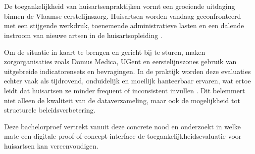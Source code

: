 
\chapter{}%
\label{ch:inleiding}



De toegankelijkheid van huisartsenpraktijken vormt een groeiende uitdaging binnen de Vlaamse
eerstelijnszorg. Huisartsen worden vandaag geconfronteerd met een stijgende werkdruk,
toenemende administratieve lasten en een dalende instroom van nieuwe artsen in de huisartsopleiding \autocite{Rampelberg2025a}.
\medskip

Om de situatie in kaart te brengen en gericht bij te sturen, maken zorgorganisaties zoals Domus Medica,
UGent en eerstelijnszones gebruik van uitgebreide indicatorensets en bevragingen. In de praktijk
worden deze evaluaties echter vaak als tijdrovend, onduidelijk en moeilijk hanteerbaar ervaren,
wat ertoe leidt dat huisartsen ze minder frequent of inconsistent invullen \autocite{Merckx2023}. Dit belemmert niet alleen
de kwaliteit van de dataverzameling, maar ook de mogelijkheid tot structurele beleidsverbetering.
\medskip

Deze bachelorproef vertrekt vanuit deze concrete nood en onderzoekt in welke mate een digitale
proof-of-concept interface de toegankelijkheidsevaluatie voor huisartsen kan vereenvoudigen.

